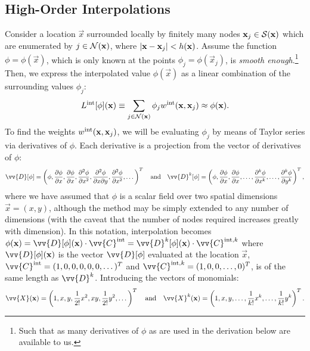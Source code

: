\subsection{High-Order Interpolations}

Consider a location $\vec{x}$ surrounded locally by finitely many nodes $\vec{x}_j \in \cl{S}(\vec{x})$ which are enumerated by $j \in \cl{N}(\vec{x})$, where $\abs{\vec{x} - \vec{x}_j} < h(\vec{x})$. Assume the function $\phi = \phi(\vec{x})$, which is only known at the points $\phi_j = \phi(\vec{x}_j)$, is \emph{smooth enough}.\footnote{Such that as many derivatives of $\phi$ as are used in the derivation below are available to us.} Then, we express the interpolated value $\phi(\vec{x})$ as a linear combination of the surrounding values $\phi_j$:
\begin{equation} \label{eqn:L}
L^{\rm{int}}[\phi](\vec{x}) \equiv \sum_{j \in \cl{N}(\vec{x})} \phi_j w^{\rm{int}}(\vec{x}, \vec{x}_j) \approx \phi(\vec{x}).
\end{equation}
To find the weights $w^{\rm{int}}(\vec{x}, \vec{x}_j)$, we will be evaluating $\phi_j$ by means of Taylor series via derivatives of $\phi$. Each derivative is a projection from the vector of derivatives of $\phi$:
\begin{equation}
\vv{D}[\phi] = \left(\phi, \pdv{\phi}{x}, \pdv{\phi}{x}, \pdv[2]{\phi}{x}, \pdv[2]{\phi}{x}{y}, \pdv[2]{\phi}{x}, \dots \right)^T
\quad \text{and} \quad
\vv{D}^k[\phi] = \left(\phi, \pdv{\phi}{x}, \pdv{\phi}{x}, \dots, \pdv[k]{\phi}{x}, \dots, \pdv[k]{\phi}{y} \right)^T,
\end{equation}
where we have assumed that $\phi$ is a scalar field over two spatial dimensions $\vec{x}=(x, y)$, although the method may be simply extended to any number of dimensions (with the caveat that the number of nodes required increases greatly with dimension). In this notation, interpolation becomes $\phi(\vec{x}) = \vv{D}[\phi](\vec{x}) \cdot \vv{C}^{\rm{int}} = \vv{D}^k[\phi](\vec{x}) \cdot \vv{C}^{\rm{int}, k}$ where $\vv{D}[\phi](\vec{x})$ is the vector $\vv{D}[\phi]$ evaluated at the location $\vec{x}$, $\vv{C}^{\rm{int}} = (1, 0, 0, 0, 0, 0, \dots)^T$ and $\vv{C}^{\rm{int}, k} = (1, 0, 0, \dots, 0)^T$, is of the same length as $\vv{D}^k$. Introducing the vectors of monomials:
\begin{equation}
\vv{X}(\vec{x}) = \left(1, x, y, \frac{1}{2!} x^2, xy, \frac{1}{2!} y^2, \dots \right)^T
\quad \text{and} \quad
\vv{X}^k(\vec{x}) = \left(1, x, y, \dots, \frac{1}{k!} x^k, \dots, \frac{1}{k!} y^k \right)^T.
\end{equation}
